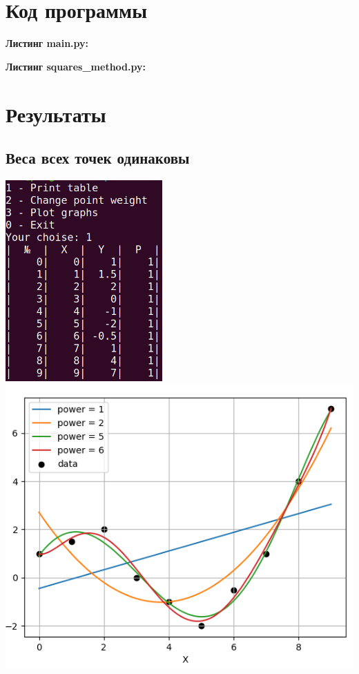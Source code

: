 \documentclass[a4paper,12pt]{article}
\begin{document}
\section{Код программы}
\noindent\textbf{Листинг main.py:}


\noindent\textbf{\newline Листинг squares\_method.py:}


\section{Результаты}

\subsection{Веса всех точек одинаковы}

\begin{center}
    \includegraphics[width=6cm]{table1.png}
    \includegraphics[scale=0.6]{graph1.png}   
\end{center}
\end{document}
